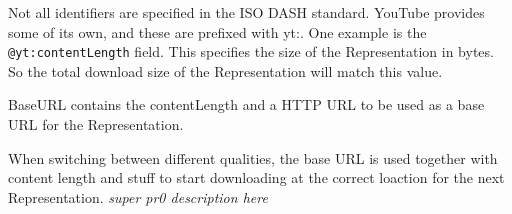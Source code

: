 Not all identifiers are specified in the ISO DASH standard. YouTube
provides some of its own, and these are prefixed with yt:. One example
is the \texttt{@yt:contentLength} field. This specifies the size of the
Representation in bytes. So the total download size of the
Representation will match this value.

BaseURL contains the contentLength and a HTTP URL to be used as a base
URL for the Representation.

When switching between different qualities, the base URL is used
together with content length and stuff to start downloading at the
correct loaction for the next Representation. \emph{super pr0
description here}

